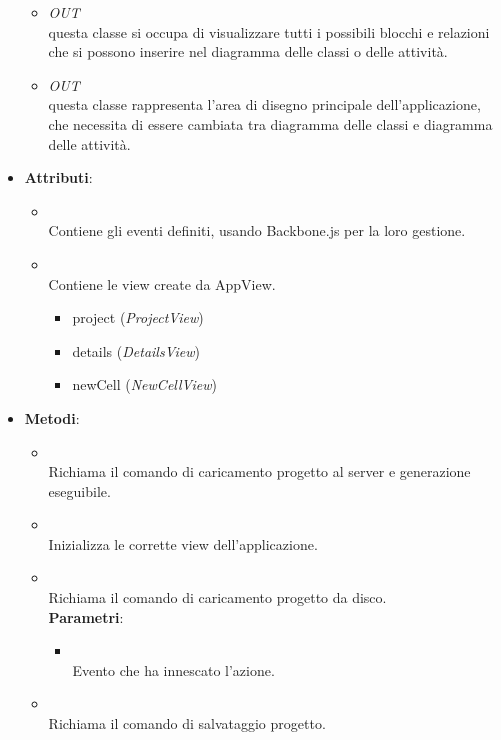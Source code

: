 \begin{itemize}
\begin{itemize}
\item \textit{OUT} \hyperref[\nogloxy{swedesigner::client::view::NewCellView}]{}\\
questa classe si occupa di visualizzare tutti i possibili blocchi e relazioni che si possono inserire nel diagramma delle classi o delle attività.
\item \textit{OUT} \hyperref[\nogloxy{swedesigner::client::view::ProjectView}]{}\\
questa classe rappresenta l'area di disegno principale dell'applicazione, che necessita di essere cambiata tra diagramma delle classi e diagramma delle attività. 
\end{itemize}
\item \textbf{Attributi}:
\begin{itemize}
\item {}
\\ Contiene gli eventi definiti, usando Backbone.js per la loro gestione.
\item {}
\\ Contiene le view create da AppView.
\begin{itemize}
\item project (\emph{ProjectView})
\item details (\emph{DetailsView})
\item newCell (\emph{NewCellView})
\end{itemize}

\end{itemize}
\item \textbf{Metodi}:
\begin{itemize}
\item {}
\\ Richiama il comando di caricamento progetto al server e generazione eseguibile.
\item {}
\\ Inizializza le corrette view dell'applicazione.
\item {}
\\ Richiama il comando di caricamento progetto da disco.
\\ \textbf{Parametri}:
\begin{itemize}
\item {}
\\ Evento che ha innescato l'azione.
\end{itemize}
\item {}
\\ Richiama il comando di salvataggio progetto.
\end{itemize}
\end{itemize}

